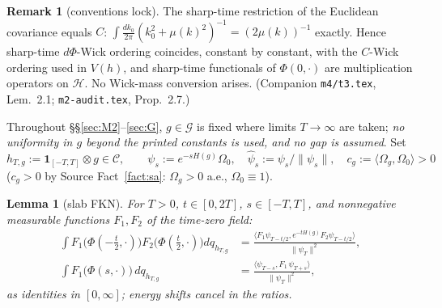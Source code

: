 \documentclass[11pt,a4paper]{article}
\theoremstyle{plain}
\newtheorem{lemma}[theorem]{Lemma}
\theoremstyle{definition}
\newtheorem{remark}[theorem]{Remark}
\newcommand{\G}{\mathcal{G}}
\newcommand{\HH}{\mathcal{H}}
\newcommand{\Om}{\Omega}
\newcommand{\ip}[2]{\langle #1,#2\rangle}
\begin{document}
\begin{remark}[conventions lock]\label{rem:conv}
The sharp-time restriction of the Euclidean covariance equals $C$:
$\int\frac{dk_0}{2\pi}(k_0^2+\mu(k)^2)^{-1}=(2\mu(k))^{-1}$ exactly. Hence sharp-time
$d\Phi$-Wick ordering coincides, constant by constant, with the $C$-Wick ordering used in
$V(h)$, and sharp-time functionals of $\Phi(0,\cdot)$ are multiplication operators on $\HH$. No
Wick-mass conversion arises. (Companion \texttt{m4/t3.tex}, Lem.~2.1; \texttt{m2-audit.tex},
Prop.~2.7.)
\end{remark}

Throughout \S\S\ref{sec:M2}--\ref{sec:G}, $g\in\G$ is fixed where limits $T\to\infty$ are taken;
\emph{no uniformity in $g$ beyond the printed constants is used, and no gap is assumed}. Set
\[
  h_{T,g}:=\mathbf 1_{[-T,T]}\otimes g\in\mathcal C,\qquad
  \psi_s:=e^{-sH(g)}\Om_0,\quad\hat\psi_s:=\psi_s/\|\psi_s\|,\quad
  c_g:=\ip{\Om_g}{\Om_0}>0
\]
($c_g>0$ by Source Fact~\ref{fact:sa}: $\Om_g>0$ a.e., $\Om_0\equiv1$).

\begin{lemma}[slab FKN]\label{lem:FKN-main}
For $T>0$, $t\in[0,2T]$, $s\in[-T,T]$, and nonnegative measurable functions $F_1,F_2$ of the
time-zero field:
\begin{align}
  \int F_1\bigl(\Phi(-\tfrac t2,\cdot)\bigr)F_2\bigl(\Phi(\tfrac t2,\cdot)\bigr)dq_{h_{T,g}}
  &=\frac{\ip{F_1\psi_{T-t/2}}{e^{-tH(g)}F_2\psi_{T-t/2}}}{\|\psi_T\|^2},\label{eq:fkn2}\\
  \int F_1\bigl(\Phi(s,\cdot)\bigr)\,dq_{h_{T,g}}
  &=\frac{\ip{\psi_{T-s}}{F_1\,\psi_{T+s}}}{\|\psi_T\|^2},\label{eq:fkn1}
\end{align}
as identities in $[0,\infty]$; energy shifts cancel in the ratios.
\end{lemma}
\end{document}
